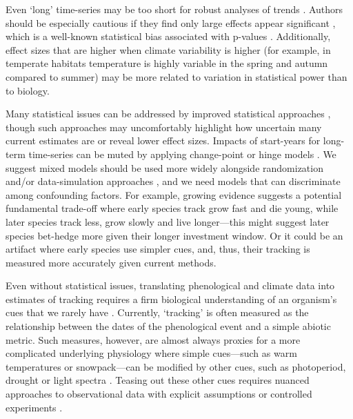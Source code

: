 \documentclass[11pt,letterpaper]{article}
\newcommand{\R}[1]{\label{#1}\linelabel{#1}}
\begin{document}
Even `long' time-series may be too short for robust analyses of trends \citep{bolmgren2013}. Authors should be especially cautious if they find only large effects appear significant \citep[e.g.,][]{CaraDonna2014}, which is a well-known statistical bias associated with p-values \citep{loken2017}. Additionally, effect sizes that are higher when climate variability is higher (for example, in temperate habitats temperature is highly variable in the spring and autumn compared to summer) may be more related to variation in statistical power than to biology. 

Many statistical issues can be addressed by improved statistical approaches \citep[e.g.,][]{gienapp2005,pearse2017}, though such approaches may uncomfortably highlight how uncertain many current estimates are \citep{brown2016} or reveal lower effect sizes. Impacts of start-years for long-term time-series can be muted by applying change-point or hinge models \citep[e.g.,][]{kharouba2018}.  We suggest mixed models should be used more widely alongside randomization and/or data-simulation approaches \citep[e.g.,][]{bolmgren2013}, and we need models that can discriminate among confounding factors. For example, growing evidence suggests a potential fundamental trade-off where early species track grow fast and die young, while later species track less, grow slowly and live longer---this might suggest later species bet-hedge more given their longer investment window. Or it could be an artifact where early species use simpler cues, and, thus, their tracking is measured more accurately given current methods.

Even without statistical issues, translating phenological and climate data into estimates of tracking requires a firm biological understanding of an organism's cues that we rarely have \citep{chmura2019}. Currently, `tracking' is often measured as the relationship between the dates of the phenological event and a simple abiotic metric. Such measures, however, are almost always proxies for a more complicated underlying physiology where simple cues---such as warm temperatures or snowpack---can be modified by other cues, such as photoperiod, drought or light spectra \citep{Bagnall1993,Stinchcombe:2004ec}. Teasing out these other cues requires nuanced approaches to observational data with explicit assumptions \citep{tansey2017}\R{citetansey} or controlled experiments \citep{Wilczek:2009oa,Caffarra:2011qf}. 
\end{document}
